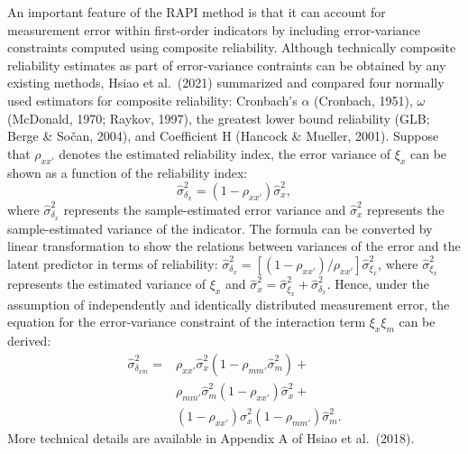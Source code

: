 \documentclass[
  man]{apa7}
\begin{document}
An important feature of the RAPI method is that it can account for measurement error within first-order indicators by including error-variance constraints computed using composite reliability. Although technically composite reliability estimates as part of error-variance contraints can be obtained by any existing methods, Hsiao et al.~(2021) summarized and compared four normally used estimators for composite reliability: Cronbach's \(\alpha\) (Cronbach, 1951), \(\omega\) (McDonald, 1970; Raykov, 1997), the greatest lower bound reliability (GLB; Berge \& Sočan, 2004), and Coefficient H (Hancock \& Mueller, 2001). Suppose that \(\rho_{xx'}\) denotes the estimated reliability index, the error variance of \(\xi_{x}\) can be shown as a function of the reliability index:
\begin{equation}
\hat{\sigma}^2_{\delta_{x}} = (1 - \rho_{xx'})\hat{\sigma}^2_{{x}},
\end{equation}
where \(\hat{\sigma}^2_{\delta_{x}}\) represents the sample-estimated error variance and \(\hat{\sigma}^2_{{x}}\) represents the sample-estimated variance of the indicator. The formula can be converted by linear transformation to show the relations between variances of the error and the latent predictor in terms of reliability: \(\hat{\sigma}_{\delta_{x}}^2 = [(1 - \rho_{xx'})/{\rho_{xx'}}]\hat{\sigma}^2_{\xi_{x}}\), where \(\hat{\sigma}^2_{\xi_{x}}\) represents the estimated variance of \(\xi_{x}\) and \(\hat{\sigma}^2_{{x}} = {\hat{\sigma}^2_{\xi_{x}} + \hat{\sigma}^2_{\delta_{x}}}\). Hence, under the assumption of independently and identically distributed measurement error, the equation for the error-variance constraint of the interaction term \(\xi_{x}\xi_{m}\) can be derived:
\begin{equation}
\begin{aligned}
\hat{\sigma}^2_{\delta_{xm}} = & \rho_{xx'}\hat{\sigma}^2_{{x}}(1 - \rho_{mm'}\hat{\sigma}^2_{{m}}) + \\&
                        \rho_{mm'}\hat{\sigma}^2_{{m}}(1-\rho_{xx'})\hat{\sigma}^2_{{x}} + \\&
                        (1 - \rho_{xx'})\hat{\sigma}^2_{{x}}(1 - \rho_{mm'})\hat{\sigma}^2_{{m}}. 
\end{aligned}
\end{equation}
More technical details are available in Appendix A of Hsiao et al.~(2018).
\end{document}
